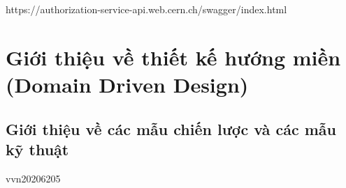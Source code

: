 \documentclass{report} %
\begin{document}
% 


https://authorization-service-api.web.cern.ch/swagger/index.html
\section{Giới thiệu về thiết kế hướng miền (Domain Driven Design)}

\subsection{Giới thiệu về các mẫu chiến lược và các mẫu kỹ thuật}



vvn20206205
\end{document}
